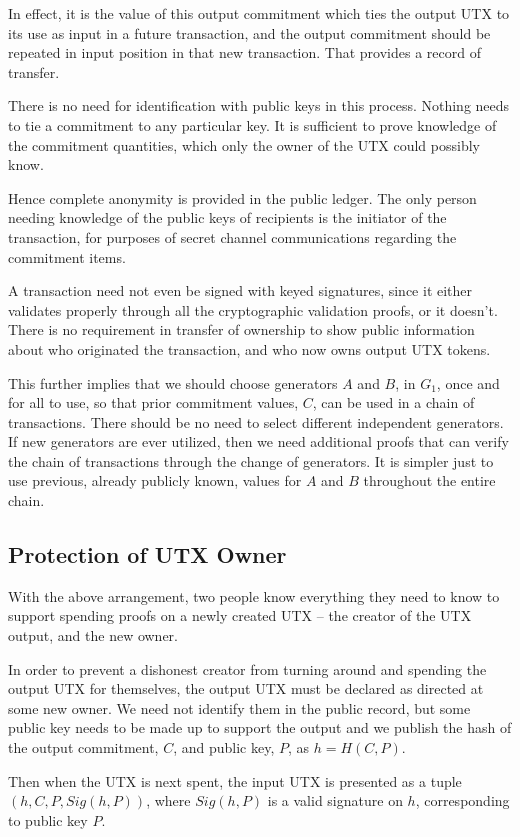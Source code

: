 \documentclass{yellowpaper}
\begin{document}
In effect, it is the value of this output commitment which ties the output UTX to its use as input in a future transaction, and the output commitment should be repeated in input position in that new transaction. That provides a record of transfer.

There is no need for identification with public keys in this process. Nothing needs to tie a commitment to any particular key. It is sufficient to prove knowledge of the commitment quantities, which only the owner of the UTX could possibly know.

Hence complete anonymity is provided in the public ledger. The only person needing knowledge of the public keys of recipients is the initiator of the transaction, for purposes of secret channel communications regarding the commitment items.

A transaction need not even be signed with keyed signatures, since it either validates properly through all the cryptographic validation proofs, or it doesn't. There is no requirement in transfer of ownership to show public information about who originated the transaction, and who now owns output UTX tokens.

This further implies that we should choose generators $A$ and $B$, in $G_1$, once and for all to use, so that prior commitment values, $C$, can be used in a chain of transactions. There should be no need to select different independent generators. If new generators are ever utilized, then we need additional proofs that can verify the chain of transactions through the change of generators. It is simpler just to use previous, already publicly known, values for $A$ and $B$ throughout the entire chain.

\subsection{Protection of UTX Owner}
With the above arrangement, two people know everything they need to know to support spending proofs on a newly created UTX -- the creator of the UTX output, and the new owner. 

In order to prevent a dishonest creator from turning around and spending the output UTX for themselves, the output UTX must be declared as directed at some new owner. We need not identify them in the public record, but some public key needs to be made up to support the output and we publish the hash of the output commitment, $C$, and public key, $P$, as $h = H(C, P)$.

Then when the UTX is next spent, the input UTX is presented as a tuple $(h, C, P, Sig(h, P))$, where $Sig(h, P)$ is a valid signature on $h$, corresponding to public key $P$.
\end{document}

